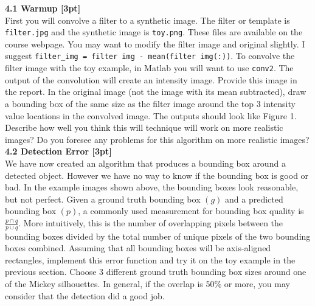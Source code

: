 \documentclass{assignment}
\begin{document}
\begin{problemlist}
\textbf{4.1 Warmup [3pt]}\\
First you will convolve a filter to a synthetic image. The filter or template is \texttt{filter.jpg} and the synthetic image is \texttt{toy.png}. These files are available on the course webpage. You may want to modify the filter image and original slightly. I suggest \texttt{filter\_img = filter img - mean(filter img(:))}. To convolve the filter image with the toy example, in Matlab you will want to use \texttt{conv2}. The output of the convolution will create an intensity image. Provide this image in the report. In the original image (not the image with its mean subtracted), draw a bounding box of the same size as the filter image around the top 3 intensity value locations in the convolved image. The outputs should look like Figure 1. Describe how well you think this will technique will work on more realistic images? Do you foresee any problems for this algorithm on more realistic images?\\

\textbf{4.2 Detection Error [3pt]}\\
We have now created an algorithm that produces a bounding box around a detected object. However we have no way to know if the bounding box is good or bad. In the example images shown above, the bounding boxes look reasonable, but not perfect. Given a ground truth bounding box $(g)$ and a predicted bounding box $(p)$, a commonly used measurement for bounding box quality is $\frac{p\cap q}{p\cup q}$. More intuitively, this is the number of overlapping pixels between the bounding boxes divided by the total number of unique pixels of the two bounding boxes combined. Assuming that all bounding boxes will be axis-aligned rectangles, implement this error function and try it on the toy example in the previous section. Choose 3 different ground truth bounding box sizes around one of the Mickey silhouettes. In general, if the overlap is 50\% or more, you may consider that the detection did a good job.\\


\end{problemlist}
\end{document}
